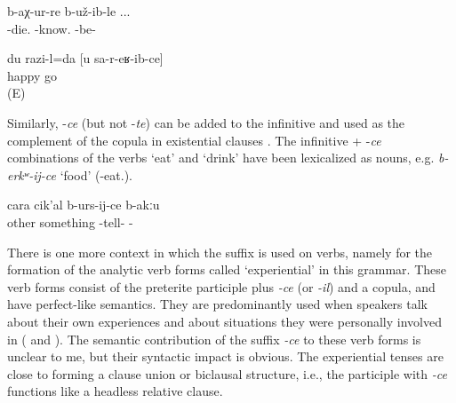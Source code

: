 \begin{exe}

	\ex	\label{ex:‎‎ She apparently got to know that he had died}
	\gll	[w-ebč'-ib-ce]	b-aχ-ur-re	b-už-ib-le ...\\
	-die.	-know.	-be- \\
	\glt	{}

	\ex	\label{ex:‎‎‎I am happy that you came_1}
	\gll	du	razi-l=da	[u		sa-r-eʁ-ib-ce]\\
			happy		go\\
	\glt	{} (E)
\end{exe}

Similarly, -\textit{ce} (but not -\textit{te}) can be added to the infinitive and used as the complement of the copula in existential clauses . The infinitive + -\textit{ce} combinations of the verbs `eat' and `drink' have been lexicalized as nouns, e.g. \textit{b-erkʷ-ij-ce} `food' (-eat.).

\begin{exe}
	\ex	\label{ex:‎‎There is nothing more to tell.min}
	\gll cara	cik'al	b-urs-ij-ce	b-akːu\\
	other	something	-tell-	- \\
	\glt	{}
\end{exe}

There is one more context in which the suffix is used on verbs, namely for the formation of the analytic verb forms called `experiential' in this grammar. These verb forms consist of the preterite participle plus \textit{-ce} (or \textit{-il}) and a copula, and have perfect-like semantics. They are predominantly used when speakers talk about their own experiences and about situations they were personally involved in ( and ). The semantic contribution of the suffix \textit{-ce} to these verb forms is unclear to me, but their syntactic impact is obvious. The experiential tenses are close to forming a clause union or biclausal structure, i.e., the participle with \textit{-ce} functions like a headless relative clause.

